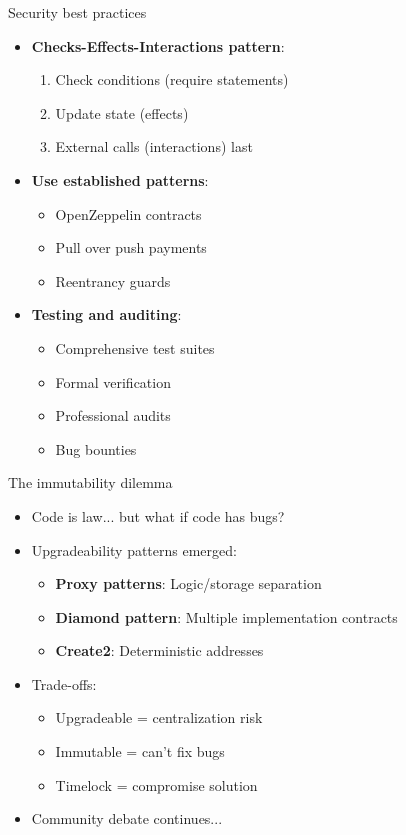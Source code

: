 \documentclass[aspectratio=169, lualatex, handout]{beamer}
\begin{document}
\begin{frame}{Security best practices}
	\begin{itemize}
		\item \textbf{Checks-Effects-Interactions pattern}:
		      \begin{enumerate}
			      \item Check conditions (require statements)
			      \item Update state (effects)
			      \item External calls (interactions) last
		      \end{enumerate}
		\item \textbf{Use established patterns}:
		      \begin{itemize}
			      \item OpenZeppelin contracts
			      \item Pull over push payments
			      \item Reentrancy guards
		      \end{itemize}
		\item \textbf{Testing and auditing}:
		      \begin{itemize}
			      \item Comprehensive test suites
			      \item Formal verification
			      \item Professional audits
			      \item Bug bounties
		      \end{itemize}
	\end{itemize}
\end{frame}

\begin{frame}{The immutability dilemma}
	\begin{itemize}
		\item Code is law... but what if code has bugs?
		\item Upgradeability patterns emerged:
		      \begin{itemize}
			      \item \textbf{Proxy patterns}: Logic/storage separation
			      \item \textbf{Diamond pattern}: Multiple implementation contracts
			      \item \textbf{Create2}: Deterministic addresses
		      \end{itemize}
		\item Trade-offs:
		      \begin{itemize}
			      \item Upgradeable = centralization risk
			      \item Immutable = can't fix bugs
			      \item Timelock = compromise solution
		      \end{itemize}
		\item Community debate continues...
	\end{itemize}
\end{frame}
\end{document}

